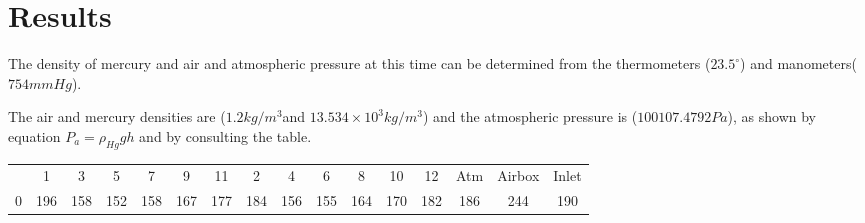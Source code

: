 \section{Results}
\FloatBarrier %

The density of mercury and air and atmospheric pressure at this time can be determined from the thermometers ($23.5^\circ$) and manometers($754mmHg$).

The air and mercury densities are ($1.2kg/m^3$and $13.534\times10^3 kg/m^3$) and the atmospheric pressure is ($100107.4792Pa$), as shown by equation $P_a=\rho_{Hg} gh$ and by consulting the table.

\begin{table}[]
	\begin{tabular}{@{}cccccccccccccccc@{}}
	\toprule
	\multirow{2}{*}{}     & \multirow{2}{*}{1}   & \multirow{2}{*}{3}   & \multirow{2}{*}{5}   & \multirow{2}{*}{7}   & \multirow{2}{*}{9}   & \multirow{2}{*}{11}  & \multirow{2}{*}{2}   & \multirow{2}{*}{4}   & \multirow{2}{*}{6}   & \multirow{2}{*}{8}   & \multirow{2}{*}{10}  & \multirow{2}{*}{12}  & \multirow{2}{*}{Atm} & \multirow{2}{*}{Airbox} & \multirow{2}{*}{Inlet} \\
						  &                      &                      &                      &                      &                      &                      &                      &                      &                      &                      &                      &                      &                      &                         &                        \\ \midrule
	\multirow{2}{*}{0}    & \multirow{2}{*}{196} & \multirow{2}{*}{158} & \multirow{2}{*}{152} & \multirow{2}{*}{158} & \multirow{2}{*}{167} & \multirow{2}{*}{177} & \multirow{2}{*}{184} & \multirow{2}{*}{156} & \multirow{2}{*}{155} & \multirow{2}{*}{164} & \multirow{2}{*}{170} & \multirow{2}{*}{182} & \multirow{2}{*}{186} & \multirow{2}{*}{244}    & \multirow{2}{*}{190}   \\
						  &                      &                      &                      &                      &                      &                      &                      &                      &                      &                      &                      &                      &                      &                         &                        \\

\end{tabular}
\end{table}

